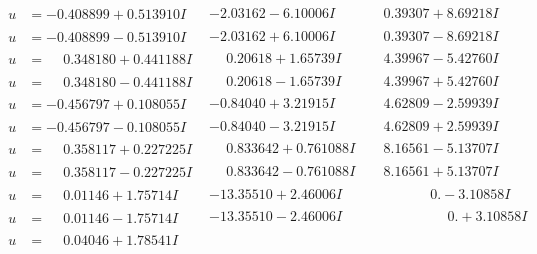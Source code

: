 \documentclass[1p]{elsarticle_modified}
\theoremstyle{definition}
\begin{document}
$$\begin{array}{c|c|c}
\begin{aligned}
u &= -0.408899 + 0.513910 I\end{aligned}
 & -2.03162 - 6.10006 I & \phantom{-}0.39307 + 8.69218 I \\ \hline\begin{aligned}
u &= -0.408899 - 0.513910 I\end{aligned}
 & -2.03162 + 6.10006 I & \phantom{-}0.39307 - 8.69218 I \\ \hline\begin{aligned}
u &= \phantom{-}0.348180 + 0.441188 I\end{aligned}
 & \phantom{-}0.20618 + 1.65739 I & \phantom{-}4.39967 - 5.42760 I \\ \hline\begin{aligned}
u &= \phantom{-}0.348180 - 0.441188 I\end{aligned}
 & \phantom{-}0.20618 - 1.65739 I & \phantom{-}4.39967 + 5.42760 I \\ \hline\begin{aligned}
u &= -0.456797 + 0.108055 I\end{aligned}
 & -0.84040 + 3.21915 I & \phantom{-}4.62809 - 2.59939 I \\ \hline\begin{aligned}
u &= -0.456797 - 0.108055 I\end{aligned}
 & -0.84040 - 3.21915 I & \phantom{-}4.62809 + 2.59939 I \\ \hline\begin{aligned}
u &= \phantom{-}0.358117 + 0.227225 I\end{aligned}
 & \phantom{-}0.833642 + 0.761088 I & \phantom{-}8.16561 - 5.13707 I \\ \hline\begin{aligned}
u &= \phantom{-}0.358117 - 0.227225 I\end{aligned}
 & \phantom{-}0.833642 - 0.761088 I & \phantom{-}8.16561 + 5.13707 I \\ \hline\begin{aligned}
u &= \phantom{-}0.01146 + 1.75714 I\end{aligned}
 & -13.35510 + 2.46006 I & \phantom{-0.000000 } 0. - 3.10858 I \\ \hline\begin{aligned}
u &= \phantom{-}0.01146 - 1.75714 I\end{aligned}
 & -13.35510 - 2.46006 I & \phantom{-0.000000 -}0. + 3.10858 I \\ \hline\begin{aligned}
u &= \phantom{-}0.04046 + 1.78541 I\end{aligned}

\end{array}$$
\end{document}

